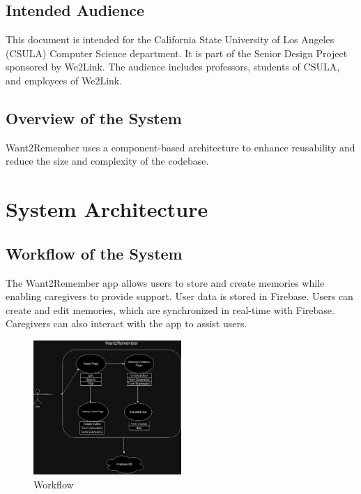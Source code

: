 \documentclass{article}
\begin{document}
\subsection{Intended Audience}
This document is intended for the California State University of Los Angeles (CSULA) Computer Science department. It is part of the Senior Design Project sponsored by We2Link. The audience includes professors, students of CSULA, and employees of We2Link.

\subsection{Overview of the System}
Want2Remember uses a component-based architecture to enhance reusability and reduce the size and complexity of the codebase.

\section{System Architecture}
\subsection{Workflow of the System}
The Want2Remember app allows users to store and create memories while enabling caregivers to provide support. User data is stored in Firebase. Users can create and edit memories, which are synchronized in real-time with Firebase. Caregivers can also interact with the app to assist users.

\begin{figure}[h!]
\includegraphics[width=0.5\textwidth]{snapshot4img4.jpg}
\caption{Workflow}
\end{figure}
\end{document}
